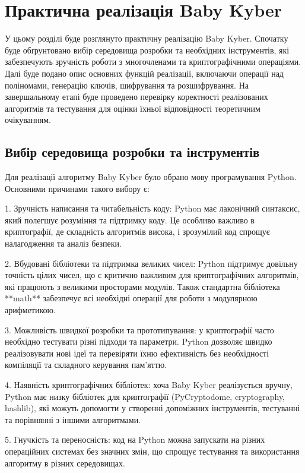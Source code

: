 \section{Практична реалізація Baby Kyber}
У цьому розділі буде розглянуто практичну реалізацію Baby Kyber. Спочатку буде обґрунтовано вибір середовища розробки та необхідних інструментів, які забезпечують зручність роботи з многочленами та криптографічними операціями. Далі буде подано опис основних функцій реалізації, включаючи операції над поліномами, генерацію ключів, шифрування та розшифрування. На завершальному етапі буде проведено перевірку коректності реалізованих алгоритмів та тестування для оцінки їхньої відповідності теоретичним очікуванням.

\subsection*{Вибір середовища розробки та інструментів} 

Для реалізації алгоритму Baby Kyber було обрано мову програмування Python. Основними причинами такого вибору є:

1. Зручність написання та читабельність коду: Python має лаконічний синтаксис, який полегшує розуміння та підтримку коду. Це особливо важливо в криптографії, де складність алгоритмів висока, і зрозумілий код спрощує налагодження та аналіз безпеки.  

2. Вбудовані бібліотеки та підтримка великих чисел:  Python підтримує довільну точність цілих чисел, що є критично важливим для криптографічних алгоритмів, які працюють з великими просторами модулів. Також стандартна бібліотека **math** забезпечує всі необхідні операції для роботи з модулярною арифметикою.  

3. Можливість швидкої розробки та прототипування:  у криптографії часто необхідно тестувати різні підходи та параметри. Python дозволяє швидко реалізовувати нові ідеї та перевіряти їхню ефективність без необхідності компіляції та складного керування пам’яттю.  

4. Наявність криптографічних бібліотек:  хоча Baby Kyber реалізується вручну, Python має низку бібліотек для криптографії (PyCryptodome, cryptography, hashlib), які можуть допомогти у створенні допоміжних інструментів, тестуванні та порівнянні з іншими алгоритмами.  

5. Гнучкість та переносність: код на Python можна запускати на різних операційних системах без значних змін, що спрощує тестування та використання алгоритму в різних середовищах.  

